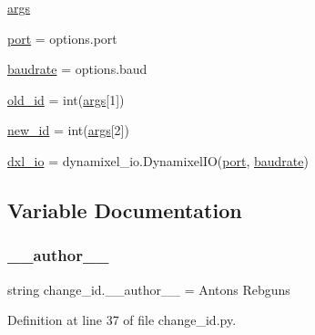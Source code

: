 \begin{DoxyCompactItemize}
\item 
\hyperlink{namespacechange__id_a5bdd55ad16e9dd8f0c26ae691f0ad139}{args}
\item 
\hyperlink{namespacechange__id_ae15063b69d5d5964211d74be8f9a57d9}{port} = options.\+port
\item 
\hyperlink{namespacechange__id_a0a8aa88d41ea33a9c067b17f95eb9e50}{baudrate} = options.\+baud
\item 
\hyperlink{namespacechange__id_a85afcf9b9ace0f857f9a76182a05ca04}{old\+\_\+id} = int(\hyperlink{namespacechange__id_a5bdd55ad16e9dd8f0c26ae691f0ad139}{args}\mbox{[}1\mbox{]})
\item 
\hyperlink{namespacechange__id_a43b9a142dee6d266957c46b55f7ca4ec}{new\+\_\+id} = int(\hyperlink{namespacechange__id_a5bdd55ad16e9dd8f0c26ae691f0ad139}{args}\mbox{[}2\mbox{]})
\item 
\hyperlink{namespacechange__id_aeeb5ee4069adbfd66d78abf35a9d734f}{dxl\+\_\+io} = dynamixel\+\_\+io.\+Dynamixel\+IO(\hyperlink{namespacechange__id_ae15063b69d5d5964211d74be8f9a57d9}{port}, \hyperlink{namespacechange__id_a0a8aa88d41ea33a9c067b17f95eb9e50}{baudrate})
\end{DoxyCompactItemize}


\subsection{Variable Documentation}
\mbox{\label{namespacechange__id_a0f761f75d7a4e14e73e499aebefbc1ee}} 
\subsubsection{\texorpdfstring{\+\_\+\+\_\+author\+\_\+\+\_\+}{\_\_author\_\_}}
{\footnotesize\ttfamily string change\+\_\+id.\+\_\+\+\_\+author\+\_\+\+\_\+ = \textquotesingle{}Antons Rebguns\textquotesingle{}\hspace{0.3cm}{\ttfamily [private]}}



Definition at line 37 of file change\+\_\+id.\+py.

\mbox{\label{namespacechange__id_a8dc3baaad34b7d48541dcd5ee050e234}} 
